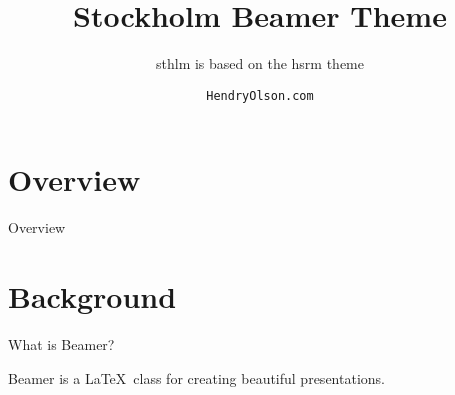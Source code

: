 \documentclass[compress]{beamer}
\title{Stockholm Beamer Theme}
\subtitle{sthlm is based on the hsrm theme}
\date{\small{\jobname}}
\author{\texttt{HendryOlson.com}}
\institute{Internationella Engelska Gymnasiet Södermalm \\ Made in {\Medium Sweden}}
\begin{document}
%
%

\maketitle


%
%

\section*{Overview}
\begin{frame}{Overview}
\tableofcontents[hideallsubsections]
\end{frame}

%
%

\section{Background}


\begin{frame}{What is Beamer?}

\centerline {Beamer is a \LaTeX\ class for creating beautiful presentations.}  
\end{frame}


%
%
\end{document}
